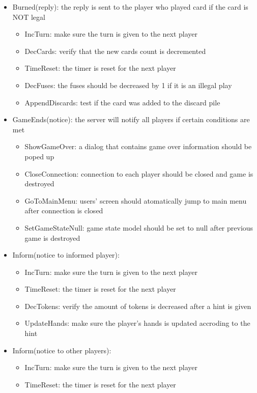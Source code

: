 \begin{description}
\begin{itemize}
		\item Burned(reply): the reply is sent to the player who played card if the card is NOT legal
			\begin{itemize}
		    	\item IncTurn: make sure the turn is given to the next player
		    	\item DecCards: verify that the new cards count is decremented
		    	\item TimeReset: the timer is reset for the next player
			\item DecFuses: the fuses should be decreased by 1 if it is an illegal play
			\item AppendDiscards: test if the card was added to the discard pile
    			\end{itemize}
		\item GameEnds(notice): the server will notify all players if certain conditions are met
			\begin{itemize}
		    	\item ShowGameOver: a dialog that contains game over information should be poped up
		    	\item CloseConnection: connection to each player should be closed and game is destroyed
		    	\item GoToMainMenu: users' screen should atomatically jump to main menu after connection is closed
			\item SetGameStateNull: game state model should be set to null after previous game is destroyed
    			\end{itemize}
		\item Inform(notice to informed player):
			\begin{itemize}
		    	\item IncTurn: make sure the turn is given to the next player
		    	\item TimeReset: the timer is reset for the next player
			\item DecTokens: verify the amount of tokens is decreased after a hint is given
			\item UpdateHands: make sure the player's hands is updated accroding to the hint
    			\end{itemize}
		\item Inform(notice to other players):
			\begin{itemize}
		    	\item IncTurn: make sure the turn is given to the next player
		    	\item TimeReset: the timer is reset for the next player

\end{itemize}
\end{itemize}
\end{description}
